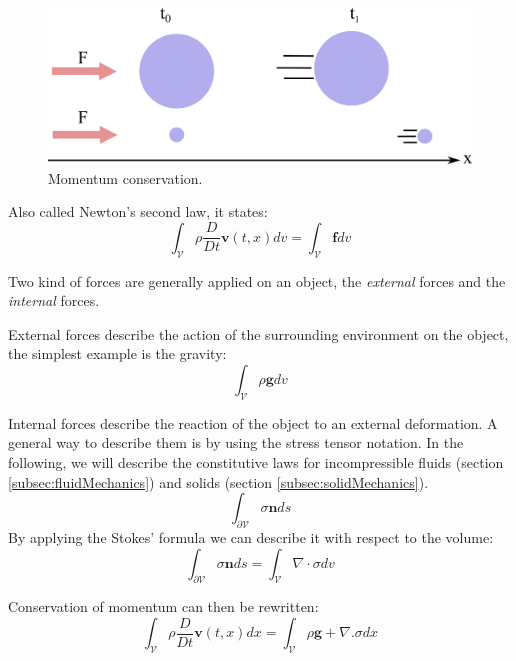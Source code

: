 \begin{figure}[!ht]
\centering
\includegraphics[scale=1.5]{images/continuum_mechanics/momentumConservation.png}
\caption[STAR mechanics: Momentum conservation]{\label{fig:momentumConservation} Momentum conservation.}
\end{figure}

Also called Newton's second law, it states:
\begin{equation}
\label{eq:momentumConservation}
\displaystyle \int_{\mathcal{V}} \rho \frac{D}{Dt} \mathbf{v}(t,x) dv = \int_{\mathcal{V}} \mathbf{f} dv
\end{equation}

Two kind of forces are generally applied on an object, the \emph{external} forces and the \emph{internal} forces.

External forces describe the action of the surrounding environment on the object, the simplest example is the gravity:
\begin{equation}
\displaystyle \int_{\mathcal{V}} \rho \mathbf{g} dv
\end{equation}

Internal forces describe the reaction of the object to an external deformation. A general way to describe them is by using the stress tensor notation. In the following, we will describe the constitutive laws for incompressible fluids (section \ref{subsec:fluidMechanics}) and solids (section \ref{subsec:solidMechanics}).
\begin{equation}
\displaystyle \int_{\partial \mathcal{V}} \sigma \mathbf{n} ds
\end{equation}
By applying the Stokes' formula we can describe it with respect to the volume:
\begin{equation}
\displaystyle 
\int_{\mathcal{\partial V}} \sigma \mathbf{n} ds =
\int_{\mathcal{V}} \nabla \cdot \sigma dv
\end{equation}

Conservation of momentum can then be rewritten:
\begin{equation}
\label{eq:volumetricMomentumConservation}
\displaystyle
\int_{\mathcal{V}} \rho \frac{D}{Dt} \mathbf{v}(t,x) dx = \int_{\mathcal{V}} \rho \mathbf{g} + \nabla. \sigma dx
\end{equation}

